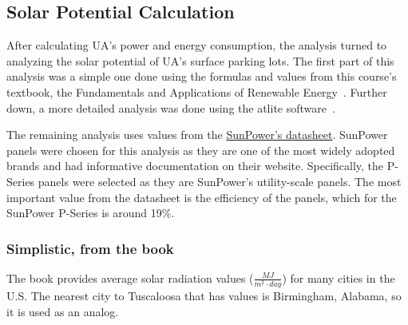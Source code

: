 \documentclass[11pt]{article}
\begin{document}
\hypertarget{solar-potential-calculation}{%
\subsection{Solar Potential
Calculation}\label{solar-potential-calculation}}

After calculating UA's power and energy consumption, the analysis turned to analyzing the solar potential of UA's surface parking lots. The first part of this analysis was a simple one done using the formulas and values from this course's textbook, the Fundamentals and Applications of Renewable Energy~\citep{kanouglu2020fundamentals}. Further down, a more detailed analysis was done using the atlite software~\citep{Hofmann_Atlite_A_Light-weight_2021}.

The remaining analysis uses values from the \href{https://us.sunpower.com/sites/default/files/media-library/data-sheets/ds-sunpower-p17-355-1500v-commercial-solar-panels.pdf}{SunPower's datasheet}. SunPower panels were chosen for this analysis as they are one of the most widely adopted brands and had informative documentation on their website. Specifically, the P-Series panels were selected as they are SunPower's utility-scale panels. The most important value from the datasheet is the efficiency of the panels, which for the SunPower P-Series is around 19\%.  

\hypertarget{simplistic-from-the-book}{%
\subsubsection{Simplistic, from the book}\label{simplistic-from-the-book}}

The book provides average solar radiation values (\(\frac{MJ}{m^2 \cdot day}\)) for many cities in the U.S. The nearest city to Tuscaloosa that has values is Birmingham, Alabama, so it is used as an analog. 
\end{document}
